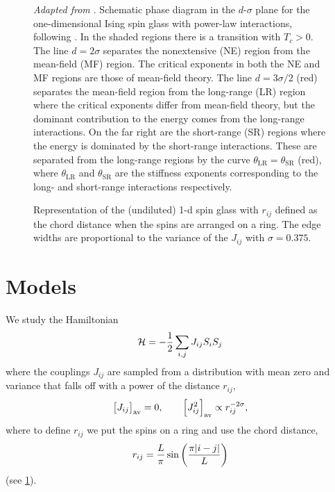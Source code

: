\begin{figure}
  \centering
  
  \caption[
    Schematic phase diagram of the one-dimensional Ising spin glass with
    power-law interactions.
  ]
  {
    \emph{Adapted from \textcite{katzgraber2003monte}}.
    Schematic phase diagram in the $d$-$\sigma$ plane for the one-dimensional
    Ising spin glass with power-law interactions, following
    \textcite{fisher1988equilibrium}. In the shaded regions there is a
    transition with $T_c>0$. The line $d=2\sigma$ separates the nonextensive
    (NE) region from the mean-field (MF) region. The critical exponents in both
    the NE and MF regions are those of mean-field theory. The line
    $d=3\sigma/2$ (red) separates the mean-field region from the long-range
    (LR) region where the critical exponents differ from mean-field theory, but
    the dominant contribution to the energy comes from the long-range
    interactions. On the far right are the short-range (SR) regions where the
    energy is dominated by the short-range interactions. These are separated
    from the long-range regions by the curve
    $\theta_{\mathrm{LR}}=\theta_{\mathrm{SR}}$ (red), where
    $\theta_{\mathrm{LR}}$ and $\theta_{\mathrm{SR}}$ are the stiffness
    exponents corresponding to the long- and short-range interactions
    respectively.
  }
\end{figure}

\begin{figure}
  \centering
  
  \caption[
    Representation of the 1-d Ising spin glass on a ring.
  ]
  {
    Representation of the (undiluted) 1-d spin glass with $r_{ij}$ defined as
    the chord distance when the spins are arranged on a ring. The edge widths
    are proportional to the variance of the $J_{ij}$ with $\sigma=0.375$.
  } \label{fig:1dlr-chord}
\end{figure}


\section{Models}
\label{sec:nonextensive-models}

We study the Hamiltonian
\begin{equation}
    \mathcal{H} = -\frac{1}{2} \sum_{i,j} J_{ij} S_i S_j
\end{equation}
where the couplings $J_{ij}$ are sampled from a distribution with mean zero and
variance that falls off with a power of the distance $r_{ij}$,
\begin{equation}
  \left[J_{ij}\right]_{\mathrm{av}} = 0,
  \qquad
  \left[J_{ij}^2\right]_{\mathrm{av}} \propto r_{ij}^{-2\sigma},
  \label{eq:J-mean-variance-lr}
\end{equation}
where to define $r_{ij}$ we put the spins on a ring and use the chord distance,
\begin{equation}
  r_{ij} = \frac{L}{\pi} \sin\left(\frac{\pi\abs{i-j}}{L}\right)
  \label{eq:chord-distance}
\end{equation}
(see \cref{fig:1dlr-chord}).

